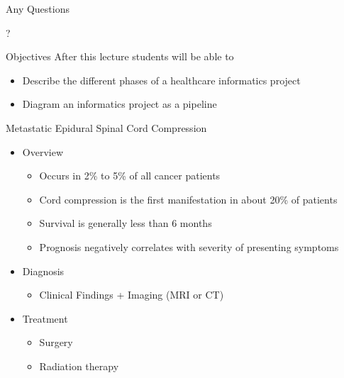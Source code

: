 \documentclass[10pt]{beamer}
\begin{document}
\begin{frame}{Any Questions}
	\begin{center}
		\Huge ?	
	\end{center}
\end{frame}



\begin{frame}{Objectives}
	After this lecture students will be able to 
	\begin{itemize}
		\item Describe the different phases of a healthcare informatics project 
		\item Diagram an informatics project as a pipeline
	\end{itemize}%
\end{frame}


\begin{frame}{Metastatic Epidural Spinal Cord Compression}
	\begin{itemize} %
		\item Overview
		\begin{itemize}
			\item Occurs in 2\% to 5\% of all cancer patients
			\item Cord compression is the first manifestation in about 20\% of patients
			\item Survival is generally less than 6 months
			\item Prognosis negatively correlates with severity of presenting symptoms
		\end{itemize}
		\item Diagnosis
		\begin{itemize}
			\item Clinical Findings + Imaging (MRI or CT)
		\end{itemize}
		\item Treatment
		\begin{itemize}
			\item Surgery
			\item Radiation therapy
		\end{itemize}
	\end{itemize}
	\begin{center}
	\end{center}
\end{frame}
\end{document}
